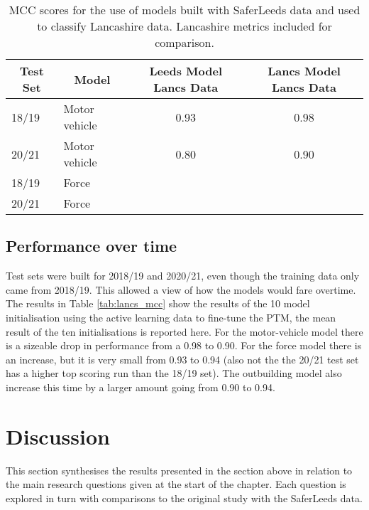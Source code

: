 \begin{table}[]
\begin{tabular}{@{}llcc@{}}
\toprule
\multicolumn{1}{c}{Test Set} & \multicolumn{1}{c}{Model} & Leeds Model Lancs Data & Lancs Model Lancs Data \\ \midrule
18/19                        & Motor vehicle             & 0.93                   & 0.98                   \\
20/21                        & Motor vehicle             & 0.80                   & 0.90                   \\
18/19                        & Force                     & \multicolumn{1}{l}{}   & \multicolumn{1}{l}{}   \\
20/21                        & Force                     & \multicolumn{1}{l}{}   & \multicolumn{1}{l}{}   \\ \bottomrule
\end{tabular}
\caption{\label{tab:results_transfer} MCC scores for the use of models built with SaferLeeds data and used to classify Lancashire data. Lancashire metrics included for comparison. }
\end{table}

\subsection{Performance over time} Test sets were built for 2018/19 and 2020/21, even though the training data only came from 2018/19. This allowed a view of how the models would fare overtime. The results in Table \ref{tab:lancs_mcc} show the results of the 10 model initialisation using the active learning data to fine-tune the PTM, the mean result of the ten initialisations is reported here. For the motor-vehicle model there is a sizeable drop in performance from a 0.98 to 0.90. For the force model there is an increase, but it is very small from 0.93 to 0.94 (also not the the 20/21 test set has a higher top scoring run than the 18/19 set). The outbuilding model also increase this time by a larger amount going from 0.90 to 0.94.


\section{Discussion} This section synthesises the results presented in the section above in relation to the main research questions given at the start of the chapter. Each question is explored in turn with comparisons to the original study with the SaferLeeds data.


